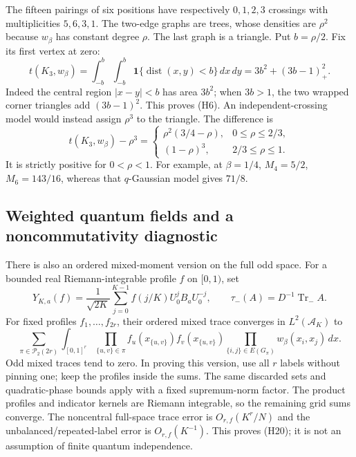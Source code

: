 The fifteen pairings of six positions have respectively \(0,1,2,3\) crossings
with multiplicities \(5,6,3,1\). The two-edge graphs are trees, whose
densities are \(\rho^2\) because \(w_\beta\) has constant degree \(\rho\).
The last graph is a triangle. Put \(b=\rho/2\). Fix its first vertex at zero:
\[
 t(K_3,w_\beta)
 =\int_{-b}^b\int_{-b}^b
        \mathbf1\{\operatorname{dist}(x,y)<b\}\,dx\,dy
 =3b^2+(3b-1)_+^2.                                        \tag{H18}
\]
Indeed the central region \(|x-y|<b\) has area \(3b^2\); when \(3b>1\),
the two wrapped corner triangles add \((3b-1)^2\). This proves (H6).
An independent-crossing model would instead assign \(\rho^3\) to the
triangle. The difference is
\[
 t(K_3,w_\beta)-\rho^3=
 \begin{cases}
  \rho^2(3/4-\rho),&0\le\rho\le2/3,\\
  (1-\rho)^3,&2/3\le\rho\le1.
 \end{cases}                                               \tag{H19}
\]
It is strictly positive for \(0<\rho<1\). For example, at \(\beta=1/4\),
\(M_4=5/2\), \(M_6=143/16\), whereas that \(q\)-Gaussian model gives \(71/8\).

\hypertarget{pell-harmonic-weighted-quantum-fields-and-a-noncommutativity-diagnostic}{%
\subsection{Weighted quantum fields and a noncommutativity diagnostic}\label{pell-harmonic-weighted-quantum-fields-and-a-noncommutativity-diagnostic}}

There is also an ordered mixed-moment version on the full odd space.
For a bounded real Riemann-integrable profile \(f\) on \([0,1)\), set
\[
 Y_{K,a}(f)=\frac1{\sqrt{2K}}\sum_{j=0}^{K-1}
                 f(j/K)U_0^jB_aU_0^{-j},\qquad
 \tau_-(A)=D^{-1}\operatorname{Tr}_-A .
\]
For fixed profiles \(f_1,\ldots,f_{2r}\), their ordered mixed trace converges
in \(L^2(\mathcal A_K)\) to
\[
 \sum_{\pi\in\mathcal P_2(2r)}
 \int_{[0,1]^r}
   \prod_{\{u,v\}\in\pi} f_u(x_{\{u,v\}})f_v(x_{\{u,v\}})
   \prod_{\{i,j\}\in E(G_\pi)}w_\beta(x_i,x_j)\,dx.             \tag{H20}
\]
Odd mixed traces tend to zero. In proving this version, use all \(r\) labels
without pinning one; keep the profiles inside the sums. The same discarded
sets and quadratic-phase bounds apply with a fixed supremum-norm factor.
The product profiles and indicator kernels are Riemann integrable, so the
remaining grid sums converge. The noncentral full-space trace error is
\(O_{r,f}(K^r/N)\) and the unbalanced/repeated-label error is \(O_{r,f}(K^{-1})\).
This proves (H20); it is not an assumption of finite quantum independence.

